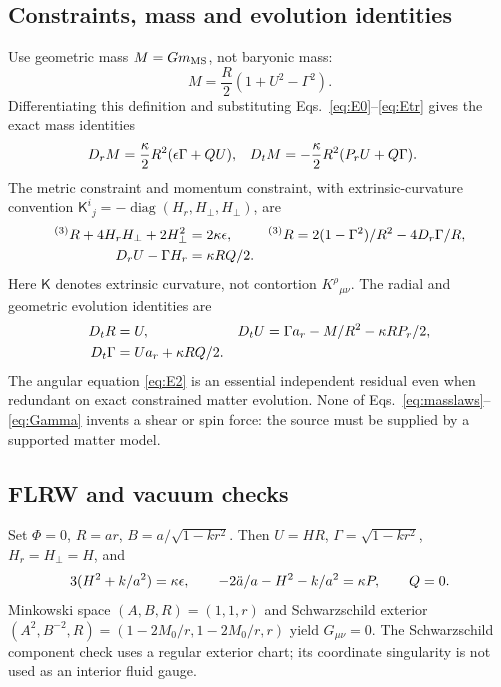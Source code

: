 \subsection{Constraints, mass and evolution identities}
Use geometric mass $M=Gm_{\rm MS}$, not baryonic mass:
\begin{equation}\label{eq:massdef}
 M=\frac R2(1+U^2-\Gamma^2).
\end{equation}
Differentiating this definition and substituting Eqs.~\eqref{eq:E0}--\eqref{eq:Etr} gives the exact mass identities
\begin{align}
 D_r M&=\frac{\kappa}2R^2(\epsilon\Gamma+QU), &
 D_t M&=-\frac{\kappa}2R^2(P_rU+Q\Gamma).\label{eq:masslaws}
\end{align}
The metric constraint and momentum constraint, with extrinsic-curvature convention $\mathsf K^i{}_j=-\operatorname{diag}(H_r,H_\perp,H_\perp)$, are
\begin{align}
 {}^{(3)}R+4H_rH_\perp+2H_\perp^2&=2\kappa\epsilon,
 &{}^{(3)}R&=2(1-\Gamma^2)/R^2-4D_r\Gamma/R,\\
 D_r U-\Gamma H_r&=\kappa RQ/2.\label{eq:ADM}
\end{align}
Here $\mathsf K$ denotes extrinsic curvature, not contortion $K^\rho{}_{\mu\nu}$. The radial and geometric evolution identities are
\begin{align}
 D_t R&=U, &D_t U&=\Gamma a_r-M/R^2-\kappa RP_r/2,\label{eq:U}\\
 D_t\Gamma&=Ua_r+\kappa RQ/2.\label{eq:Gamma}
\end{align}
The angular equation \eqref{eq:E2} is an essential independent residual even when redundant on exact constrained matter evolution. None of Eqs.~\eqref{eq:masslaws}--\eqref{eq:Gamma} invents a shear or spin force: the source must be supplied by a supported matter model.

\subsection{FLRW and vacuum checks}
Set $\Phi=0$, $R=ar$, $B=a/\sqrt{1-kr^2}$. Then $U=HR$, $\Gamma=\sqrt{1-kr^2}$, $H_r=H_\perp=H$, and
\begin{equation}\label{eq:flrwEFE}
 3(H^2+k/a^2)=\kappa\epsilon,\qquad -2\ddot a/a-H^2-k/a^2=\kappa P,
 \qquad Q=0.
\end{equation}
Minkowski space $(A,B,R)=(1,1,r)$ and Schwarzschild exterior $(A^2,B^{-2},R)=(1-2M_0/r,1-2M_0/r,r)$ yield $G_{\mu\nu}=0$. The Schwarzschild component check uses a regular exterior chart; its coordinate singularity is not used as an interior fluid gauge.
